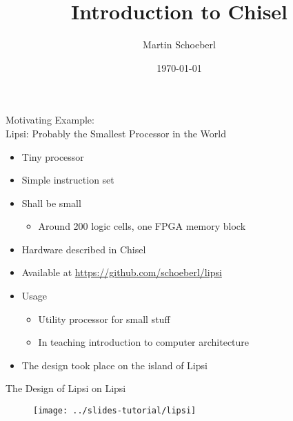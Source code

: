 

\newif\ifbook


\usepackage{tikz}
\usetikzlibrary{positioning, arrows.meta}


\title{Introduction to Chisel}
\author{Martin Schoeberl}
\date{\today}



\begin{frame}
\titlepage
\end{frame}

\begin{frame}[fragile]{Motivating Example:\\
Lipsi: Probably the Smallest Processor in the World}
\begin{itemize}
\item Tiny processor
\item Simple instruction set
\item Shall be small
\begin{itemize}
\item Around 200 logic cells, one FPGA memory block
\end{itemize}
\item Hardware described in Chisel
\item Available at \url{https://github.com/schoeberl/lipsi}
\item Usage
\begin{itemize}
\item Utility processor for small stuff
\item In teaching introduction to computer architecture
\end{itemize}
\item The design took place on the island of Lipsi
\end{itemize}
\end{frame}

\begin{frame}[fragile]{The Design of Lipsi on Lipsi}
\begin{figure}
    \centering
    \texttt{[image: ../slides-tutorial/lipsi]}
\end{figure}
\end{frame}

